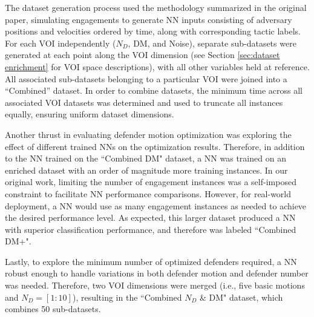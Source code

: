 \documentclass[journal]{IEEEtran} %
\begin{document}
The dataset generation process used the methodology summarized in the original paper, simulating engagements to generate NN inputs consisting of adversary positions and velocities ordered by time, along with corresponding tactic labels. For each VOI independently ($N_D$, DM, and Noise), separate sub-datasets were generated at each point along the VOI dimension (see Section \ref{sec:dataset enrichment} for VOI space descriptions), with all other variables held at reference. All associated sub-datasets belonging to a particular VOI were joined into a ``Combined” dataset. In order to combine datasets, the minimum time across all associated VOI datasets was determined and used to truncate all instances equally, ensuring uniform dataset dimensions.

Another thrust in evaluating defender motion optimization was exploring the effect of different trained NNs on the optimization results. Therefore, in addition to the NN trained on the ``Combined DM" dataset, a NN was trained on an enriched dataset with an order of magnitude more training instances. In our original work, limiting the number of engagement instances was a self-imposed constraint to facilitate NN performance comparisons. However, for real-world deployment, a NN would use as many engagement instances as needed to achieve the desired performance level. As expected, this larger dataset produced a NN with superior classification performance, and therefore was labeled ``Combined DM+".

Lastly, to explore the minimum number of optimized defenders required, a NN robust enough to handle variations in both defender motion and defender number was needed. Therefore, two VOI dimensions were merged (i.e., five basic motions and $N_D=[1:10]$), resulting in the ``Combined $N_D$ \& DM" dataset, which combines 50 sub-datasets.
\end{document}
